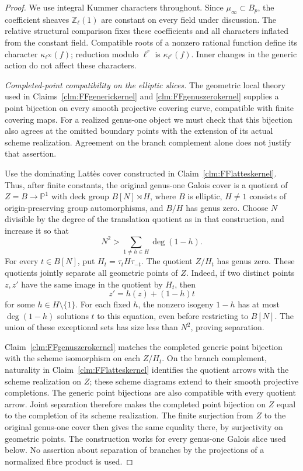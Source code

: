 \begin{proof}
We use integral Kummer characters throughout. Since
\(\mu_\infty\subset B_p\), the coefficient sheaves
\(\mathbb Z_\ell(1)\) are constant on every field
under discussion. The relative structural comparison
fixes these coefficients and all characters inflated
from the constant field. Compatible roots of a
nonzero rational function define its character
\(\kappa_{\ell^\infty}(f)\); reduction modulo
\(\ell^r\) is \(\kappa_{\ell^r}(f)\).
Inner changes in the generic action do not affect
these characters.

\emph{Completed-point compatibility on the elliptic slices.}
The geometric local theory used in
Claims~\ref{clm:FFgenerickernel} and
\ref{clm:FFgenuszerokernel} supplies a point
bijection on every smooth projective covering curve,
compatible with finite covering maps. For a
realized genus-one object we must check that this
bijection also agrees at the omitted boundary points
with the extension of its actual scheme realization.
Agreement on the branch complement alone does not
justify that assertion.

Use the dominating Latt\`es cover constructed in
Claim~\ref{clm:FFlatteskernel}. Thus, after finite
constants, the original genus-one Galois cover is a
quotient of
\(Z=B\to\mathbb P^1\) with deck group
\(B[N]\rtimes H\), where \(B\) is elliptic,
\(H\ne1\) consists of origin-preserving group
automorphisms, and \(B/H\) has genus zero. Choose
\(N\) divisible by the degree of the translation
quotient as in that construction, and increase it
so that
\[
              N^2>\sum_{1\ne h\in H}\deg(1-h).
                                                        \tag{FF.49.3}
\]
For every \(t\in B[N]\), put
\(H_t=\tau_tH\tau_{-t}\). The quotient
\(Z/H_t\) has genus zero. These quotients jointly
separate all geometric points of \(Z\). Indeed,
if two distinct points \(z,z'\) have the same
image in the quotient by \(H_t\), then
\[
                  z'=h(z)+(1-h)t
\]
for some \(h\in H\setminus\{1\}\). For each
fixed \(h\), the nonzero isogeny \(1-h\) has
at most \(\deg(1-h)\) solutions \(t\) to this
equation, even before restricting to \(B[N]\).
The union of these exceptional sets has size less
than \(N^2\), proving separation.

Claim~\ref{clm:FFgenuszerokernel} matches the
completed generic point bijection with the scheme
isomorphism on each \(Z/H_t\). On the branch
complement, naturality in
Claim~\ref{clm:FFlatteskernel} identifies the
quotient arrows with the scheme realization on
\(Z\); these scheme diagrams extend to their
smooth projective completions. The generic point
bijections are also compatible with every quotient
arrow. Joint separation therefore makes the
completed point bijection on \(Z\) equal to the
completion of its scheme realization. The finite
surjection from \(Z\) to the original genus-one
cover then gives the same equality there, by
surjectivity on geometric points. The construction
works for every genus-one Galois slice used below.
No assertion about separation of branches by the
projections of a normalized fibre product is used.


\end{proof}
